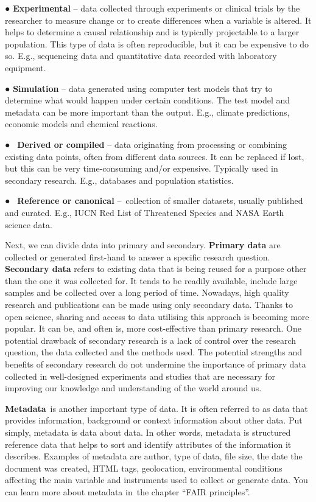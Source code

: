 \documentclass[
]{book}
\begin{document}
● \textbf{Experimental} -- data collected through experiments or clinical trials by the researcher to measure change or to create differences when a variable is altered. It helps to determine a causal relationship and is typically projectable to a larger population. This type of data is often reproducible, but it can be expensive to do so. E.g., sequencing data and quantitative data recorded with laboratory equipment.

● \textbf{Simulation} -- data generated using computer test models that try to determine what would happen under certain conditions. The test model and metadata can be more important than the output. E.g., climate predictions, economic models and chemical reactions.

● ~\textbf{Derived or compiled} -- data originating from processing or combining existing data points, often from different data sources. It can be replaced if lost, but this can be very time-consuming and/or expensive. Typically used in secondary research. E.g., databases and population statistics.

● ~\textbf{Reference or canonical} --~collection of smaller datasets, usually published and curated. E.g., IUCN Red List of Threatened Species and NASA Earth science data.

Next, we can divide data into primary and secondary. \textbf{Primary data} are collected or generated first-hand to answer a specific research question. \textbf{Secondary data} refers to existing data that is being reused for a purpose other than the one it was collected for. It tends to be readily available, include large samples and be collected over a long period of time. Nowadays, high quality research and publications can be made using only secondary data. Thanks to open science, sharing and access to data utilising this approach is becoming more popular. It can be, and often is, more cost-effective than primary research. One potential drawback of secondary research is a lack of control over the research question, the data collected and the methods used. The potential strengths and benefits of secondary research do not undermine the importance of primary data collected in well-designed experiments and studies that are necessary for improving our knowledge and understanding of the world around us.

\textbf{Metadata}~is another important type of data. It is often referred to as data that provides information, background or context information about other data. Put simply, metadata is data about data. In other words, metadata is structured reference data that helps to sort and identify attributes of the information it describes. Examples of metadata are author, type of data, file size, the date the document was created, HTML tags, geolocation, environmental conditions affecting the main variable and instruments used to collect or generate data. You can learn more about metadata in~the chapter ``FAIR principles''.
\end{document}
